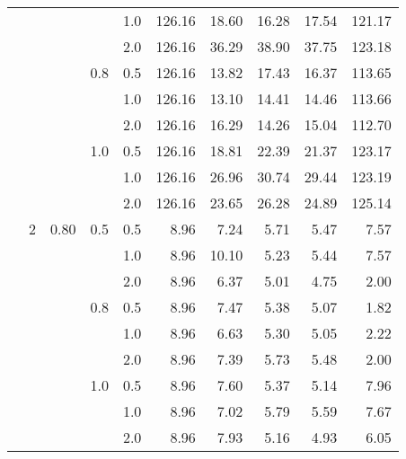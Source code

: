 \documentclass{article}
\begin{document}
{\begin{tabular}{lllllrrrrr}
            &     &      &     & 1.0 &  126.16 &   18.60 &             16.28 &                17.54 &     121.17 \\
            &     &      &     & 2.0 &  126.16 &   36.29 &             38.90 &                37.75 &     123.18 \\
            &     &      & 0.8 & 0.5 &  126.16 &   13.82 &             17.43 &                16.37 &     113.65 \\
            &     &      &     & 1.0 &  126.16 &   13.10 &             14.41 &                14.46 &     113.66 \\
            &     &      &     & 2.0 &  126.16 &   16.29 &             14.26 &                15.04 &     112.70 \\
            &     &      & 1.0 & 0.5 &  126.16 &   18.81 &             22.39 &                21.37 &     123.17 \\
            &     &      &     & 1.0 &  126.16 &   26.96 &             30.74 &                29.44 &     123.19 \\
            &     &      &     & 2.0 &  126.16 &   23.65 &             26.28 &                24.89 &     125.14 \\
            & 2 & 0.80 & 0.5 & 0.5 &    8.96 &    7.24 &              5.71 &                 5.47 &       7.57 \\
            &     &      &     & 1.0 &    8.96 &   10.10 &              5.23 &                 5.44 &       7.57 \\
            &     &      &     & 2.0 &    8.96 &    6.37 &              5.01 &                 4.75 &       2.00 \\
            &     &      & 0.8 & 0.5 &    8.96 &    7.47 &              5.38 &                 5.07 &       1.82 \\
            &     &      &     & 1.0 &    8.96 &    6.63 &              5.30 &                 5.05 &       2.22 \\
            &     &      &     & 2.0 &    8.96 &    7.39 &              5.73 &                 5.48 &       2.00 \\
            &     &      & 1.0 & 0.5 &    8.96 &    7.60 &              5.37 &                 5.14 &       7.96 \\
            &     &      &     & 1.0 &    8.96 &    7.02 &              5.79 &                 5.59 &       7.67 \\
            &     &      &     & 2.0 &    8.96 &    7.93 &              5.16 &                 4.93 &       6.05 \\

\end{tabular}}
\end{document}
